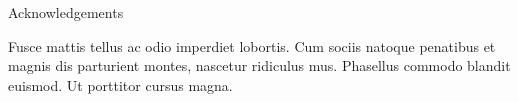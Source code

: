 \documentclass[a1paper,portrait,fontscale=0.418]{baposter}
\begin{document}
\begin{poster}

\begin{posterbox}[name=acknowledgements,span=2,column=1,below=conclusion]{Acknowledgements}

\smaller %
Fusce mattis tellus ac odio imperdiet lobortis. Cum sociis natoque penatibus et magnis dis parturient montes, nascetur ridiculus mus. Phasellus commodo blandit euismod. Ut porttitor cursus magna.
\end{posterbox}



\end{poster}
\end{document}
